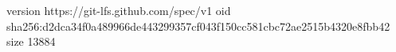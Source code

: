 version https://git-lfs.github.com/spec/v1
oid sha256:d2dca34f0a489966de443299357cf043f150cc581cbc72ae2515b4320e8fbb42
size 13884
